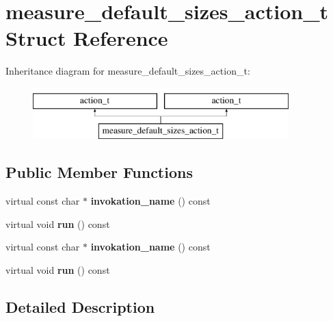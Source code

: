 \hypertarget{structmeasure__default__sizes__action__t}{}\section{measure\+\_\+default\+\_\+sizes\+\_\+action\+\_\+t Struct Reference}
\label{structmeasure__default__sizes__action__t}
Inheritance diagram for measure\+\_\+default\+\_\+sizes\+\_\+action\+\_\+t\+:\begin{figure}[H]
\begin{center}
\leavevmode
\includegraphics[height=2.000000cm]{structmeasure__default__sizes__action__t}
\end{center}
\end{figure}
\subsection*{Public Member Functions}
\begin{DoxyCompactItemize}
\item 
\mbox{\label{structmeasure__default__sizes__action__t_a0fc46794127c0969a197ca6939fea743}} 
virtual const char $\ast$ {\bfseries invokation\+\_\+name} () const
\item 
\mbox{\label{structmeasure__default__sizes__action__t_a5efe4ed712585335504ef98a65a3370f}} 
virtual void {\bfseries run} () const
\item 
\mbox{\label{structmeasure__default__sizes__action__t_a0fc46794127c0969a197ca6939fea743}} 
virtual const char $\ast$ {\bfseries invokation\+\_\+name} () const
\item 
\mbox{\label{structmeasure__default__sizes__action__t_a5efe4ed712585335504ef98a65a3370f}} 
virtual void {\bfseries run} () const
\end{DoxyCompactItemize}


\subsection{Detailed Description}


